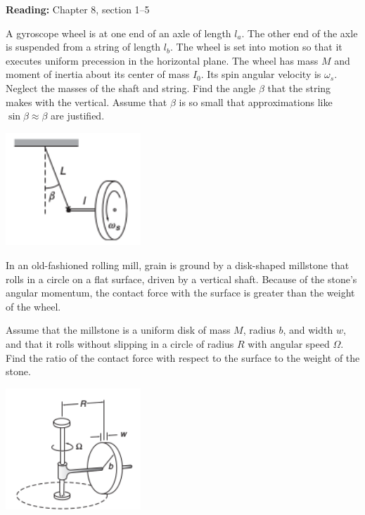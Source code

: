 \documentclass[12pt,letterpaper]{hmcpset}
\begin{document}

\noindent
\textbf{Reading:} Chapter 8, section 1--5

\begin{problem}
    A gyroscope wheel is at one end of an axle of length
    $l_{a}$. The other end of the axle is suspended from
    a string of length $l_{b}$. The wheel is set into motion
    so that it executes uniform precession in the horizontal
    plane. The wheel has mass $M$ and moment of inertia about
    its center of mass $I_{0}$. Its spin angular velocity is
    $\omega_{s}$. Neglect the masses of the shaft and string.
    Find the angle $\beta$ that the string makes with the vertical.
    Assume that $\beta$ is so small that approximations like
    $\sin\beta \approx \beta$ are justified.

    \begin{center}
        \includegraphics[width=2in]{img/8_3}
    \end{center}
\end{problem}
\begin{solution}
    \vfill
\end{solution}
\clearpage

\begin{problem}
    In an old-fashioned rolling mill, grain is ground
    by a disk-shaped millstone that rolls in a circle
    on a flat surface, driven by a vertical shaft. Because
    of the stone's angular momentum, the contact force
    with the surface is greater than the weight of the wheel.

    Assume that the millstone is a uniform disk of mass $M$,
    radius $b$, and width $w$, and that it rolls without
    slipping in a circle of radius $R$ with angular speed
    $\Omega$. Find the ratio of the contact force with respect
    to the surface to the weight of the stone.

    \begin{center}
        \includegraphics[width=2in]{img/8_4}
    \end{center}
\end{problem}
\begin{solution}
    \vfill
\end{solution}
\clearpage
\end{document}
